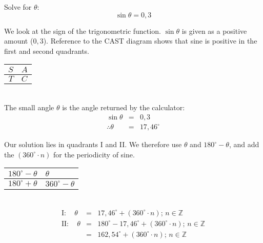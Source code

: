 \begin{wex}{}
{
Solve for $\theta$: 
\[\sin \theta = 0,3 \]
}
{
\begin{minipage}{0.7\textwidth}
We look at the sign of the trigonometric function. $\sin\theta$ is given as a positive amount ($0,3$). Reference to the CAST diagram shows that sine is positive in the first and second quadrants.
\end{minipage}
\begin{minipage}{0.3\textwidth}
\begin{center}
\begin{tabular}{r|l}
$S$ & $A$ \\
\hline
$T$ & $C$ 
\end{tabular}
\end{center}
\end{minipage}\\

The small angle $\theta$ is the angle returned by the calculator:
\begin{eqnarray*}
\sin \theta &= &0,3\\
\therefore \theta &=& 17,46^\circ
\end{eqnarray*}

\begin{minipage}{0.65\textwidth}
Our solution lies in quadrants I and II. We therefore use $\theta$ and $180^\circ - \theta$, and add the $(360^\circ\cdot n)$ for the periodicity of sine.
\end{minipage}
\begin{minipage}{0.35\textwidth}
\begin{center}
\footnotesize
\begin{tabular}{r|l}
 $180^{\circ} - \theta$ & $\theta$ \\
\hline
 $180^{\circ} + \theta$ & $360^{\circ} - \theta$ 
\end{tabular}
\normalsize
\end{center}
\end{minipage}\\
\begin{eqnarray*}
\mathrm{I:} \quad \theta &=& 17,46^{\circ} + (360^{\circ}\cdot n)\mbox{; } n \in \mathbb{Z}  \\
\mathrm{II:} \quad \theta &=& 180^{\circ} - 17,46^{\circ} + (360^{\circ}\cdot n) \mbox{; } n \in \mathbb{Z} \\
&=& 162,54^{\circ} + (360^{\circ}\cdot n) \mbox{; } n \in \mathbb{Z}
\end{eqnarray*}

}
\end{wex}
